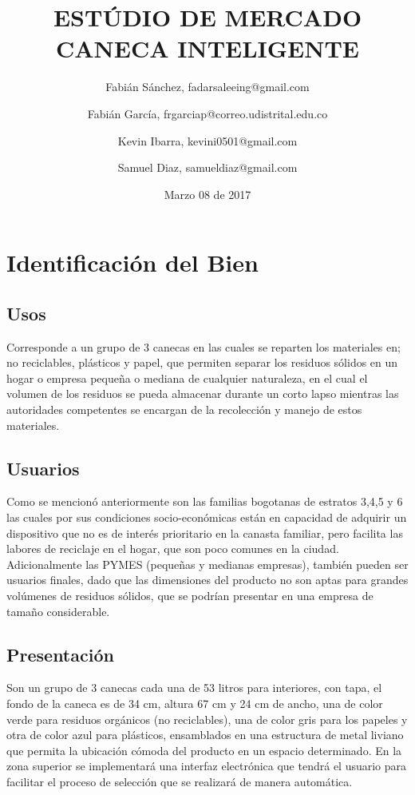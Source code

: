 \documentclass{report}
\title{ESTÚDIO DE MERCADO CANECA INTELIGENTE}
\author{Fabián Sánchez, fadarsaleeing@gmail.com \and Fabián García, frgarciap@correo.udistrital.edu.co \and Kevin Ibarra, kevini0501@gmail.com \and Samuel Diaz, samueldiaz@gmail.com}
\date{Marzo 08 de 2017}
\begin{document}
\maketitle


 \tableofcontents



\chapter{Identificación del Bien}

    \section{Usos}
    Corresponde a un grupo de 3 canecas en las cuales se reparten los materiales en; no reciclables, plásticos y papel, que permiten separar los residuos sólidos en un hogar o empresa pequeña o mediana de cualquier naturaleza, en el cual el volumen de los residuos se pueda almacenar durante un corto lapso mientras las autoridades competentes se encargan de la recolección y manejo de estos materiales.
    
    \section{Usuarios}
    Como se mencionó anteriormente son las familias bogotanas de estratos 3,4,5 y 6 las cuales por sus condiciones socio-económicas están en capacidad de adquirir un dispositivo que no es de interés prioritario en la canasta familiar, pero facilita las labores de reciclaje en el hogar, que son poco comunes en la ciudad. Adicionalmente las PYMES (pequeñas y medianas empresas), también pueden ser usuarios finales, dado que las dimensiones del producto no son aptas para grandes volúmenes de residuos sólidos, que se podrían presentar en una empresa de tamaño considerable.
    
    \section{Presentación}
    Son un grupo de 3 canecas cada una de 53 litros para interiores, con tapa, el fondo de la caneca es de 34 cm, altura 67 cm y 24 cm de ancho, una de color verde para residuos orgánicos (no reciclables), una de color gris para los papeles y otra de color azul para plásticos, ensamblados en una estructura de metal liviano que permita la ubicación cómoda del producto en un espacio determinado. En la zona superior se implementará una interfaz electrónica que tendrá el usuario para facilitar el proceso de selección que se realizará de manera automática.  
    
\end{document}
